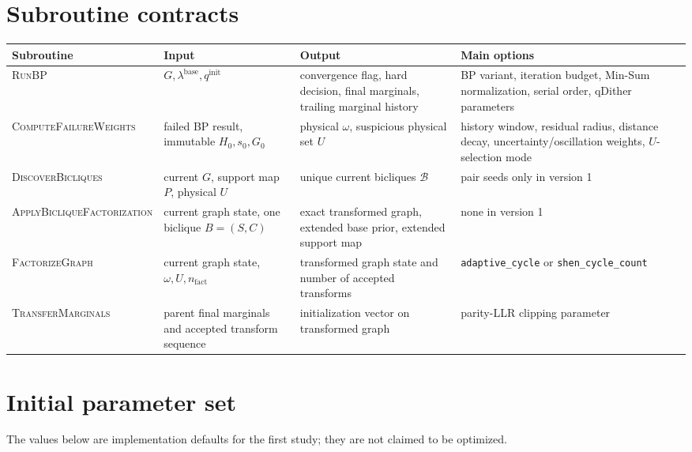 \documentclass[11pt,a4paper]{article}
\newcommand{\Bcal}{\mathcal B}
\begin{document}
\section{Subroutine contracts}

\begin{longtable}{@{}p{34mm}p{48mm}p{48mm}p{33mm}@{}}
\toprule
Subroutine & Input & Output & Main options \\
\midrule
\endhead
\textsc{RunBP}
&
$G,\lambda^{\mathrm{base}},q^{\mathrm{init}}$
&
convergence flag, hard decision, final marginals, trailing marginal history
&
BP variant, iteration budget, Min-Sum normalization, serial order, qDither parameters
\\[1mm]

\textsc{ComputeFailureWeights}
&
failed BP result, immutable $H_0,s_0,G_0$
&
physical $\omega$, suspicious physical set $U$
&
history window, residual radius, distance decay, uncertainty/oscillation weights, $U$-selection mode
\\[1mm]

\textsc{DiscoverBicliques}
&
current $G$, support map $P$, physical $U$
&
unique current bicliques $\Bcal$
&
pair seeds only in version 1
\\[1mm]

\textsc{ApplyBicliqueFactorization}
&
current graph state, one biclique $B=(S,C)$
&
exact transformed graph, extended base prior, extended support map
&
none in version 1
\\[1mm]

\textsc{FactorizeGraph}
&
current graph state, $\omega,U,n_{\mathrm{fact}}$
&
transformed graph state and number of accepted transforms
&
\texttt{adaptive\_cycle} or \texttt{shen\_cycle\_count}
\\[1mm]

\textsc{TransferMarginals}
&
parent final marginals and accepted transform sequence
&
initialization vector on transformed graph
&
parity-LLR clipping parameter
\\
\bottomrule
\end{longtable}

\section{Initial parameter set}

The values below are implementation defaults for the first study; they are not
claimed to be optimized.
\end{document}
